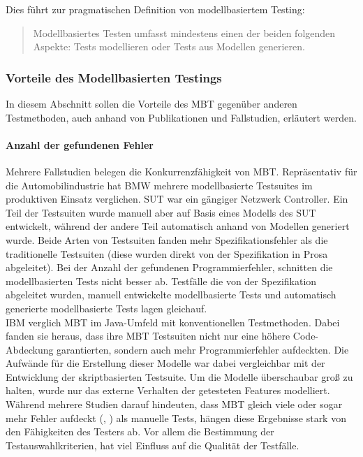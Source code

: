 Dies führt zur pragmatischen Definition von modellbasiertem Testing:

\begin{quote}
Modellbasiertes Testen umfasst mindestens einen der beiden folgenden Aspekte: Tests modellieren oder Tests aus Modellen generieren.
\end{quote}

\subsubsection{Vorteile des Modellbasierten Testings}
In diesem Abschnitt sollen die Vorteile des MBT gegenüber anderen Testmethoden, auch anhand von Publikationen und Fallstudien, erläutert werden.

\paragraph{Anzahl der gefundenen Fehler} Mehrere Fallstudien belegen die Konkurrenzfähigkeit von MBT. Repräsentativ für die Automobilindustrie hat BMW mehrere modellbasierte Testsuites im produktiven Einsatz verglichen.\cite{pretschner_one_2005} SUT war ein gängiger Netzwerk Controller. Ein Teil der Testsuiten wurde manuell aber auf Basis eines Modells des SUT entwickelt, während der andere Teil automatisch anhand von Modellen generiert wurde. Beide Arten von Testsuiten fanden mehr Spezifikationsfehler als die traditionelle Testsuiten (diese wurden direkt von der Spezifikation in Prosa abgeleitet). Bei der Anzahl der gefundenen Programmierfehler, schnitten die modellbasierten Tests nicht besser ab. Testfälle die von der Spezifikation abgeleitet wurden, manuell entwickelte modellbasierte Tests und automatisch generierte modellbasierte Tests lagen gleichauf.\\
IBM verglich MBT im Java-Umfeld mit konventionellen Testmethoden.\cite{farchi_using_2002} Dabei fanden sie heraus, dass ihre MBT Testsuiten nicht nur eine höhere Code-Abdeckung garantierten, sondern auch mehr Programmierfehler aufdeckten. Die Aufwände für die Erstellung dieser Modelle war dabei vergleichbar mit der Entwicklung der skriptbasierten Testsuite. Um die Modelle überschaubar groß zu halten, wurde nur das externe Verhalten der getesteten Features modelliert.\\
Während mehrere Studien darauf hindeuten, dass MBT gleich viele oder sogar mehr Fehler aufdeckt (\cite{dalal_model-based_1999}, \cite{legeard_generation_2001}) als manuelle Tests, hängen diese Ergebnisse stark von den Fähigkeiten des Testers ab. Vor allem die Bestimmung der Testauswahlkriterien, hat viel Einfluss auf die Qualität der Testfälle.\cite{utting_practical_2007}

